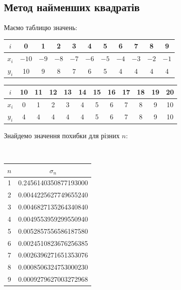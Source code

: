 

\subsection{Метод найменших квадратів}

Маємо таблицю значень:

\begin{table}[H]
    \centering
    \begin{tabular}{|c|c|c|c|c|c|c|c|c|c|c|} \hline
        $i$ & 0 & 1 & 2 & 3 & 4 & 5 & 6 & 7 & 8 & 9 \\ \hline
        $x_i$ & $-10$ & $-9$ & $-8$ & $-7$ & $-6$ & $-5$ & $-4$ & $-3$ & $-2$ & $-1$ \\ \hline 
        $y_i$ & 10 & 9 & 8 & 7 & 6 & 5 & 4 & 4 & 4 & 4 \\ \hline
    \end{tabular}
    \break
    \hfill 
    \break
    \begin{tabular}{|c|c|c|c|c|c|c|c|c|c|c|c|} \hline
        $i$ & 10 & 11 & 12 & 13 & 14 & 15 & 16 & 17 & 18 & 19 & 20 \\ \hline
        $x_i$ & 0 & 1 & 2 & 3 & 4 & 5 & 6 & 7 & 8 & 9 & 10 \\ \hline
        $y_i$ & 4 & 4 & 4 & 4 & 4 & 5 & 6 & 7 & 8 & 9 & 10 \\ \hline
    \end{tabular}
\end{table}

Знайдемо значення похибки для різних $n$:

\begin{table}[H]
    \tt
    \centering
    \begin{tabular}{|c|c|} \hline
        $n$ & $\sigma_n$ \\ \hline
        1 & 0.2456140350877193000 \\ \hline
        2 & 0.0044225627749655240 \\ \hline
        3 & 0.0046827135264340840 \\ \hline
        4 & 0.0049553959299550940 \\ \hline
        5 & 0.0052857556586187580 \\ \hline
        6 & 0.0024510823676256385 \\ \hline
        7 & 0.0026396271651353076 \\ \hline
        8 & 0.0008506324753000230 \\ \hline
        9 & 0.0009279627003272968 \\ \hline
    \end{tabular}
\end{table}

